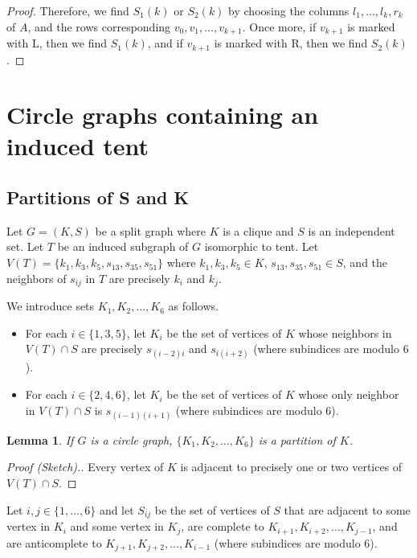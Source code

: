 \documentclass[a4paper,10pt]{report}
\theoremstyle{plain}
\newtheorem{lema}{Lemma}
\theoremstyle{remark}
\theoremstyle{plain}
\begin{document}
{\begin{proof}
	Therefore, we find $S_1(k)$ or $S_2(k)$ by choosing the columns $l_1, \ldots, l_k, r_k$ of $A$, and the rows corresponding $v_0, v_1, \ldots, v_{k+1}$. Once more, if $v_{k+1}$ is marked with L, then we find $S_1(k)$, and if $v_{k+1}$ is marked with R, then we find $S_2(k)$.
	
 \end{proof}


\section{Circle graphs containing an induced tent}

\subsection{Partitions of S and K}

Let $G=(K,S)$ be a split graph where $K$ is a clique and $S$ is an independent set. Let $T$ be an induced subgraph of $G$ isomorphic to tent. Let $V(T)=\{k_1,k_3,k_5,s_{13},s_{35},s_{51}\}$ where $k_1,k_3,k_5\in K$, $s_{13},s_{35},s_{51}\in S$, and the neighbors of $s_{ij}$ in $T$ are precisely $k_i$ and $k_j$.

We introduce sets $K_1,K_2,\ldots,K_6$ as follows.
\begin{itemize}
 \item For each $i\in\{1,3,5\}$, let $K_i$ be the set of vertices of $K$ whose neighbors in $V(T)\cap S$ are precisely $s_{(i-2)i}$ and $s_{i(i+2)}$ (where subindices are modulo $6$).
 \item For each $i\in\{2,4,6\}$, let $K_i$ be the set of vertices of $K$ whose only neighbor in $V(T)\cap S$ is $s_{(i-1)(i+1)}$ (where subindices are modulo $6$).
\end{itemize}

\begin{lema} If $G$ is a circle graph, $\{K_1,K_2,\ldots,K_6\}$ is a partition of $K$.\end{lema}
\begin{proof}[Proof (Sketch).] Every vertex of $K$ is adjacent to precisely one or two vertices of $V(T)\cap S$.\end{proof}

Let $i,j\in\{1,\ldots,6\}$ and let $S_{ij}$ be the set of vertices of $S$ that are adjacent to some vertex in $K_i$ and some vertex in $K_j$, are complete to $K_{i+1},K_{i+2},\ldots,K_{j-1}$, and are anticomplete to $K_{j+1},K_{j+2},\ldots,K_{i-1}$ (where subindices are modulo $6$).

}
\end{document}
